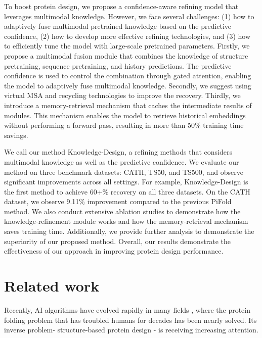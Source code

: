 \documentclass{article}
\begin{document}
To boost protein design, we propose a confidence-aware refining model that leverages multimodal knowledge. However, we face several challenges: (1) how to adaptively fuse multimodal pretrained knowledge based on the predictive confidence, (2) how to develop more effective refining technologies, and (3) how to efficiently tune the model with large-scale pretrained parameters. Firstly, we propose a multimodal fusion module that combines the knowledge of structure pretraining, sequence pretraining, and history predictions. The predictive confidence is used to control the combination through gated attention, enabling the model to adaptively fuse multimodal knowledge. Secondly, we suggest using virtual MSA and recycling technologies to improve the recovery. Thirdly, we introduce a memory-retrieval mechanism that caches the intermediate results of modules. This mechanism enables the model to retrieve historical embeddings without performing a forward pass, resulting in more than 50\% training time savings. 




We call our method Knowledge-Design, a refining methods that considers multimodal knowledge as well as the predictive confidence. We evaluate our method on three benchmark datasets: CATH, TS50, and TS500, and observe significant improvements across all settings. For example, Knowledge-Design is the first method to achieve 60+\% recovery on all three datasets. On the CATH dataset, we observe 9.11\% improvement compared to the previous PiFold method. We also conduct extensive ablation studies to demonstrate how the knowledge-refinement module works and how the memory-retrieval mechanism saves training time. Additionally, we provide further analysis to demonstrate the superiority of our proposed method. Overall, our results demonstrate the effectiveness of our approach in improving protein design performance.





 \section{Related work}
Recently, AI algorithms have evolved rapidly in many fields \citep{gao2022simvp, cao2022survey, tan2022simvp, li2022openmixup, he2020momentum, stark2022equibind, gao2023prefixmol}, where the protein folding problem \citep{jumper2021highly,wu2022high,lin2022language,mirdita2022colabfold,wang2022helixfold,li2022uni, gao2023diffsds} that has troubled humans for decades has been nearly solved. Its inverse problem- structure-based protein design - is receiving increasing attention.
\end{document}
